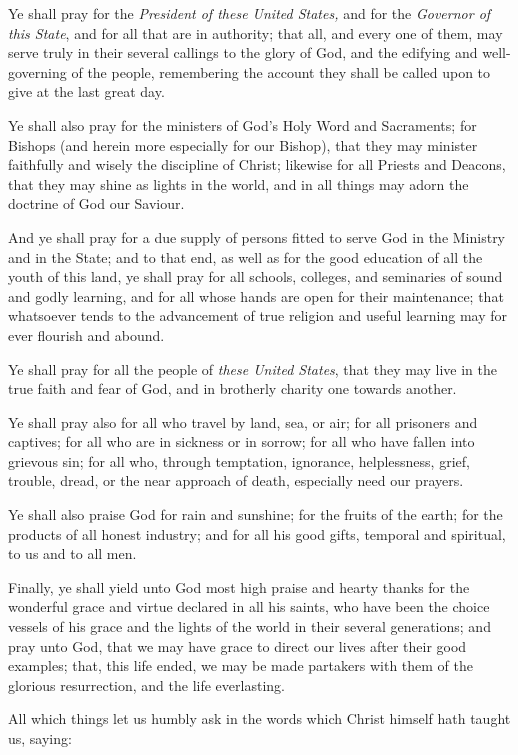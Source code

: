 Ye shall pray for the \emph{President of these United States,} and for the \emph{Governor of this State}, and for all that are in authority; that all, and every one of them, may serve truly in their several callings to the glory of God, and the edifying and well-governing of the people, remembering the account they shall be called upon to give at the last great day.

Ye shall also pray for the ministers of God’s Holy Word and Sacraments; for Bishops (and herein more especially for our Bishop), that they may minister faithfully and wisely the discipline of Christ; likewise for all Priests and Deacons, that they may shine as lights in the world, and in all things may adorn the doctrine of God our Saviour.

And ye shall pray for a due supply of persons fitted to serve God in the Ministry and in the State; and to that end, as well as for the good education of all the youth of this land, ye shall pray for all schools, colleges, and seminaries of sound and godly learning, and for all whose hands are open for their maintenance; that whatsoever tends to the advancement of true religion and useful learning may for ever flourish and abound.

Ye shall pray for all the people of \emph{these United States}, that they may live in the true faith and fear of God, and in brotherly charity one towards another.

Ye shall pray also for all who travel by land, sea, or air; for all prisoners and captives; for all who are in sickness or in sorrow; for all who have fallen into grievous sin; for all who, through temptation, ignorance, helplessness, grief, trouble, dread, or the near approach of death, especially need our prayers.

Ye shall also praise God for rain and sunshine; for the fruits of the earth; for the products of all honest industry; and for all his good gifts, temporal and spiritual, to us and to all men.

Finally, ye shall yield unto God most high praise and hearty thanks for the wonderful grace and virtue declared in all his saints, who have been the choice vessels of his grace and the lights of the world in their several generations; and pray unto God, that we may have grace to direct our lives after their good examples; that, this life ended, we may be made partakers with them of the glorious resurrection, and the life everlasting.

All which things let us humbly ask in the words which Christ himself hath taught us, saying:


